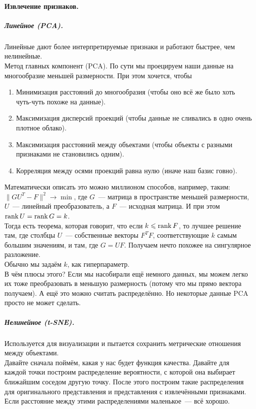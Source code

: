 \documentclass{article}
\begin{document}
    \paragraph{Извлечение признаков.}
    \subparagraph{Линейное (PCA).}
    Линейные дают более интерпретируемые признаки и работают быстрее, чем нелинейные.\\
    Метод главных компонент (PCA). По сути мы проецируем наши данные на многообразие меньшей размерности. При этом хочется, чтобы
    \begin{enumerate}
        \item Минимизация расстояний до многообразия (чтобы оно всё же было хоть чуть-чуть похоже на данные).
        \item Максимизация дисперсий проекций (чтобы данные не сливались в одно очень плотное облако).
        \item Максимизация расстояний между объектами (чтобы объекты с разными признаками не становились одним).
        \item Корреляция между осями проекций равна нулю (иначе наш базис говно).
    \end{enumerate}
    Математически описать это можно миллионом способов, например, таким: $\|GU^T-F\|^2\to\min$, где $G$~--- матрица в пространстве меньшей размерности, $U$~--- линейный преобразователь, а $F$~--- исходная матрица. И при этом $\operatorname{rank} U=\operatorname{rank} G=k$.\\
    Тогда есть теорема, которая говорит, что если $k\leqslant\operatorname{rank} F$, то лучшее решение там, где столбцы $U$~--- собственные векторы $F^TF$, соответствующие $k$ самым большим значениям, и там, где $G=UF$. Получаем нечто похожее на сингулярное разложение.\\
    Обычно мы задаём $k$, как гиперпараметр.\\
    В чём плюсы этого? Если мы насобирали ещё немного данных, мы можем легко их тоже преобразовать в меньшую размерность (потому что мы прямо вектора получаем). А ещё это можно считать распределённо. Но некоторые данные PCA просто не может сделать.
    \subparagraph{Нелинейное (t-SNE).}
    Используется для визуализации и пытается сохранить метрические отношения между объектами.\\
    Давайте сначала поймём, какая у нас будет функция качества. Давайте для каждой точки построим распределение вероятности, с которой она выбирает ближайшим соседом другую точку. После этого построим такие распределения для оригинального представления и представления с извлечёнными признаками. Если расстояние между этими распределениями маленькое~--- всё хорошо.\\
\end{document}
